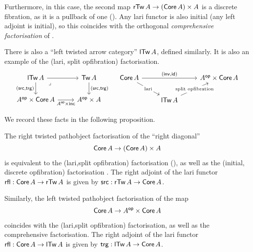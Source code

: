 Furthermore, in this case, the second map
$\mathop{\mathsf{rTw}}{A} \to (\mathop{\mathsf{Core}} A) \times A$ is a discrete fibration,
as it is a pullback of one ().
Any lari functor is also initial (any left adjoint is initial),
so this coincides with the orthogonal
\emph{comprehensive factorisation}
of \cite{street1973}.

There is also a ``left twisted arrow category'' $\mathop{\mathsf{lTw}}{A}$,
defined similarly.
It is also an example of the (lari, split opfibration)
factorisation.
\[
\begin{tikzcd}
	{\lTw{A}} & {\Tw{A}} \\
	{{A}^\op \times \Core{A}} & {{A}^\op \times A}
	\arrow[from=1-1, to=1-2]
	\arrow["{(\src,\trg)}"', from=1-1, to=2-1]
	\arrow["\lrcorner"{anchor=center, pos=0.125}, draw=none, from=1-1, to=2-2]
	\arrow["{(\src,\trg)}", from=1-2, to=2-2]
	\arrow["{{A}^\op \times \inc}"', from=2-1, to=2-2]
\end{tikzcd}
\quad
\begin{tikzcd}
	{\Core{A}} && {{A}^\op \times \Core{A}} \\
	& {\lTw{A}}
	\arrow["{(\inv, \id)}", from=1-1, to=1-3]
	\arrow["{\text{lari}}"{description}, from=1-1, to=2-2]
	\arrow["{{\text{split opfibration}}}"{description}, from=2-2, to=1-3]
\end{tikzcd}
\]

We record these facts in the following proposition.
\begin{proposition}\label{prop:right-twisted-factorisation-equiv}
  The right twisted pathobject factorisation of the
  ``right diagonal'' \[\mathop{\mathsf{Core}} A \to (\mathop{\mathsf{Core}} A) \times A\] is equivalent
  to the (lari,split opfibration) factorisation (),
  as well as the (initial, discrete opfibration) factorisation \cite{street1973}.
  The right adjoint of the lari functor $\mathop{\mathsf{rfl}} : \mathop{\mathsf{Core}} A \to \mathop{\mathsf{rTw}} A$
  is given by $\mathop{\mathsf{src}} : \mathop{\mathsf{rTw}} A \to \mathop{\mathsf{Core}} A$.

  Similarly, the left twisted pathobject factorisation of
  the map \[\mathop{\mathsf{Core}} A \to A^{\mathsf{op}} \times \mathop{\mathsf{Core}} A\] coincides with
  the (lari,split opfibration) factorisation,
  as well as the comprehensive factorisation.
  The right adjoint of the lari functor $\mathop{\mathsf{rfl}} : \mathop{\mathsf{Core}} A \to \mathop{\mathsf{lTw}} A$
  is given by $\mathop{\mathsf{trg}} : \mathop{\mathsf{lTw}} A \to \mathop{\mathsf{Core}} A$.
\end{proposition}


